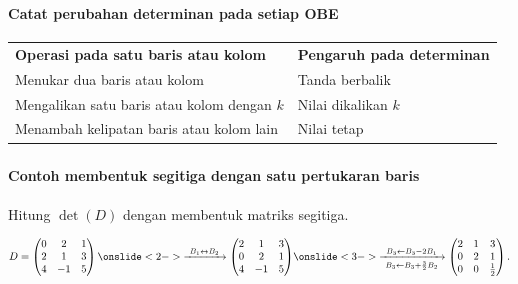 \documentclass{../../kalkulus-ppt}
\begin{document}
\begin{frame}
    \frametitle{\insertsection}
    \framesubtitle{Catat perubahan determinan pada setiap OBE}
    \begin{center}
        \begin{tabular}{p{8.2cm}l}
            \rowcolor{HIMAtua!18}
            \textbf{Operasi pada satu baris atau kolom} & \textbf{Pengaruh pada determinan}\\
            Menukar dua baris atau kolom & Tanda berbalik\\
            Mengalikan satu baris atau kolom dengan $k$ & Nilai dikalikan $k$\\
            Menambah kelipatan baris atau kolom lain & Nilai tetap
        \end{tabular}
    \end{center}
\end{frame}

\begin{frame}
    \frametitle{\insertsection}
    \framesubtitle{Contoh membentuk segitiga dengan satu pertukaran baris}
    \begin{contoh}
        Hitung $\det(D)$ dengan membentuk matriks segitiga.
    \end{contoh}
    \[
        D=\begin{pmatrix}0&2&1\\2&1&3\\4&-1&5\end{pmatrix}
        \onslide<2->{%
            \xrightarrow{\ B_1\leftrightarrow B_2\ }
            \begin{pmatrix}2&1&3\\0&2&1\\4&-1&5\end{pmatrix}
        }
        \onslide<3->{%
            \xrightarrow[\ B_3\gets B_3+\frac32 B_2\ ]{\ B_3\gets B_3-2B_1\ }
            \begin{pmatrix}2&1&3\\0&2&1\\0&0&\tfrac12\end{pmatrix}.
        }
    \]
\end{frame}
\end{document}
